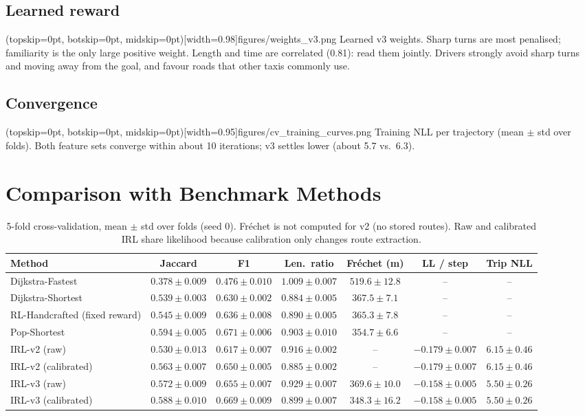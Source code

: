 \documentclass{ieeeaccess}
\begin{document}
\subsection{Learned reward}
\Figure[t!](topskip=0pt, botskip=0pt, midskip=0pt)[width=0.98\columnwidth]{figures/weights_v3.png}
{Learned v3 weights. Sharp turns are most penalised; familiarity is the only large positive weight. Length and time are correlated (0.81): read them jointly.\label{fig:w}}
Drivers strongly avoid sharp turns and moving away from the goal, and favour roads that other taxis commonly use.

\subsection{Convergence}
\Figure[t!](topskip=0pt, botskip=0pt, midskip=0pt)[width=0.95\columnwidth]{figures/cv_training_curves.png}
{Training NLL per trajectory (mean $\pm$ std over folds). Both feature sets converge within about 10 iterations; v3 settles lower (about 5.7 vs.\ 6.3).\label{fig:conv}}

\section{Comparison with Benchmark Methods}\label{sec:compare}
\begin{table}[t]
\centering\footnotesize
\caption{5-fold cross-validation, mean $\pm$ std over folds (seed 0). Fr\'echet is not computed for v2 (no stored routes). Raw and calibrated IRL share likelihood because calibration only changes route extraction.}\label{tab:cv}
\begin{tabular}{lcccccc}
\toprule
Method & Jaccard & F1 & Len.\ ratio & Fr\'echet (m) & LL / step & Trip NLL\\
\midrule
Dijkstra-Fastest & $0.378\pm0.009$ & $0.476\pm0.010$ & $1.009\pm0.007$ & $519.6\pm12.8$ & -- & --\\
Dijkstra-Shortest & $0.539\pm0.003$ & $0.630\pm0.002$ & $0.884\pm0.005$ & $367.5\pm7.1$ & -- & --\\
RL-Handcrafted (fixed reward) & $0.545\pm0.009$ & $0.636\pm0.008$ & $0.890\pm0.005$ & $365.3\pm7.8$ & -- & --\\
Pop-Shortest & $\mathbf{0.594\pm0.005}$ & $\mathbf{0.671\pm0.006}$ & $0.903\pm0.010$ & $354.7\pm6.6$ & -- & --\\
IRL-v2 (raw) & $0.530\pm0.013$ & $0.617\pm0.007$ & $0.916\pm0.002$ & -- & $-0.179\pm0.007$ & $6.15\pm0.46$\\
IRL-v2 (calibrated) & $0.563\pm0.007$ & $0.650\pm0.005$ & $0.885\pm0.002$ & -- & $-0.179\pm0.007$ & $6.15\pm0.46$\\
IRL-v3 (raw) & $0.572\pm0.009$ & $0.655\pm0.007$ & $0.929\pm0.007$ & $369.6\pm10.0$ & $\mathbf{-0.158\pm0.005}$ & $\mathbf{5.50\pm0.26}$\\
IRL-v3 (calibrated) & $0.588\pm0.010$ & $0.669\pm0.009$ & $0.899\pm0.007$ & $\mathbf{348.3\pm16.2}$ & $\mathbf{-0.158\pm0.005}$ & $\mathbf{5.50\pm0.26}$\\
\bottomrule
\end{tabular}
\end{table}
\end{document}
